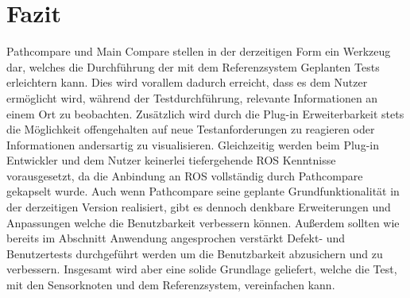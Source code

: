 \chapter{Fazit}
\label{sec:conclusion}
Pathcompare und Main Compare stellen in der derzeitigen Form ein Werkzeug dar, welches die
Durchführung der mit dem Referenzsystem Geplanten Tests erleichtern kann. Dies wird vorallem
dadurch erreicht, dass es dem Nutzer ermöglicht wird, während der Testdurchführung, relevante
Informationen an einem Ort zu beobachten. Zusätzlich wird durch die Plug-in
Erweiterbarkeit stets die Möglichkeit offengehalten auf neue Testanforderungen
zu reagieren oder Informationen andersartig zu visualisieren. Gleichzeitig
werden beim Plug-in Entwickler und dem Nutzer keinerlei tiefergehende ROS
Kenntnisse vorausgesetzt, da die Anbindung an ROS vollständig durch Pathcompare
gekapselt wurde. Auch wenn Pathcompare seine geplante Grundfunktionalität in der
derzeitigen Version realisiert, gibt es dennoch denkbare Erweiterungen und
Anpassungen welche die Benutzbarkeit verbessern können. 
Außerdem sollten wie bereits im Abschnitt Anwendung angesprochen verstärkt
Defekt- und Benutzertests durchgeführt werden um die Benutzbarkeit abzusichern
und zu verbessern. Insgesamt wird aber eine solide Grundlage geliefert,
welche die Test, mit den Sensorknoten und dem Referenzsystem, vereinfachen kann.


